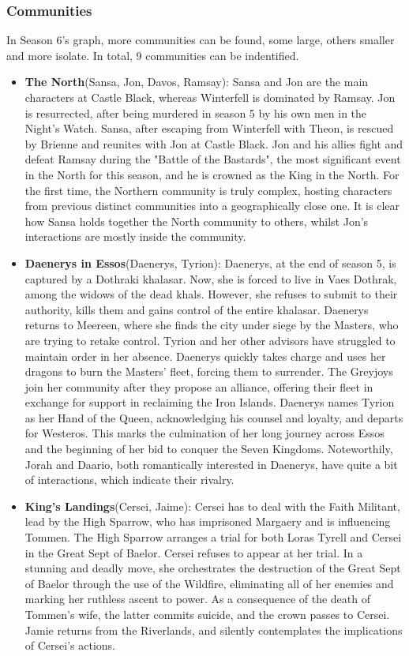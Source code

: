 \documentclass[10pt,twocolumn,letterpaper]{article}
\begin{document}
\subsubsection{Communities}

In Season 6's graph, more communities can be found, some large, others smaller and more isolate. In total, 9 communities can be indentified.

\begin{itemize}
    \item \textbf{The North}(Sansa, Jon, Davos, Ramsay): Sansa and Jon are the main characters at Castle Black, whereas Winterfell is dominated by Ramsay. Jon is resurrected, after being murdered in season 5 by his own men in the Night's Watch. Sansa, after escaping from Winterfell with Theon, is rescued by Brienne and reunites with Jon at Castle Black. Jon and his allies fight and defeat Ramsay during the "Battle of the Bastards", the most significant event in the North for this season, and he is crowned as the King in the North.  For the first time, the Northern community is truly complex, hosting characters from previous distinct communities into a geographically close one. It is clear how Sansa holds together the North community to others, whilst Jon's interactions are mostly inside the community.
    \item \textbf{Daenerys in Essos}(Daenerys, Tyrion): Daenerys, at the end of season 5, is captured by a Dothraki khalasar. Now, she is forced to live in Vaes Dothrak, among the widows of the dead khals. However, she refuses to submit to their authority, kills them and gains control of the entire khalasar. Daenerys returns to Meereen, where she finds the city under siege by the Masters, who are trying to retake control. Tyrion and her other advisors have struggled to maintain order in her absence. Daenerys quickly takes charge and uses her dragons to burn the Masters' fleet, forcing them to surrender. The Greyjoys join her community after they propose an alliance, offering their fleet in exchange for support in reclaiming the Iron Islands. Daenerys names Tyrion as her Hand of the Queen, acknowledging his counsel and loyalty, and departs for Westeros. This marks the culmination of her long journey across Essos and the beginning of her bid to conquer the Seven Kingdoms. Noteworthily, Jorah and Daario, both romantically interested in Daenerys, have quite a bit of interactions, which indicate their rivalry.
    \item \textbf{King's Landings}(Cersei, Jaime): Cersei has to deal with the Faith Militant, lead by the High Sparrow, who has imprisoned Margaery and is influencing Tommen. The High Sparrow arranges a trial for both Loras Tyrell and Cersei in the Great Sept of Baelor. Cersei refuses to appear at her trial. In a stunning and deadly move, she orchestrates the destruction of the Great Sept of Baelor through the use of the Wildfire, eliminating all of her enemies and marking her ruthless ascent to power. As a consequence of the death of Tommen's wife, the latter commits suicide, and the crown passes to Cersei. Jamie returns from the Riverlands, and silently contemplates the implications of Cersei's actions.

\end{itemize}
\end{document}
